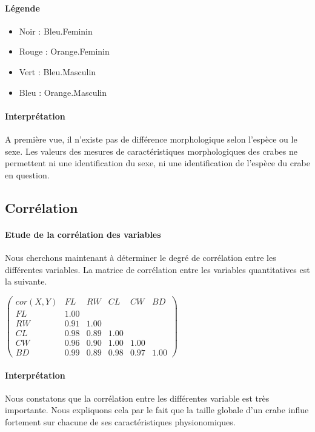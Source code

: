 \documentclass{report}
\begin{document}
\paragraph{Légende}
\begin{itemize}
\item Noir : Bleu.Feminin
\item Rouge : Orange.Feminin
\item Vert : Bleu.Masculin
\item Bleu : Orange.Masculin
\end{itemize}
\paragraph{Interprétation}
A première vue, il n’existe pas de différence morphologique selon l’espèce ou le
sexe. Les valeurs des mesures de caractéristiques morphologiques des crabes ne
permettent ni une identification du sexe, ni une identification de l’espèce du
crabe en question.
\newpage
\subsection{Corrélation}
\paragraph{Etude de la corrélation des variables}
Nous cherchons maintenant à déterminer le degré de corrélation entre les différentes variables. La matrice de corrélation entre les variables quantitatives est la suivante.
\begin{center}
$\begin{pmatrix}
    cor(X,Y) & FL & RW & CL & CW & BD\\
    FL & 1.00\\
    RW & 0.91 & 1.00 \\
    CL & 0.98 & 0.89 & 1.00\\
    CW & 0.96 & 0.90 & 1.00 & 1.00\\
    BD & 0.99 & 0.89 & 0.98 & 0.97 & 1.00
\end{pmatrix}$
\end{center}
\paragraph{Interprétation}
Nous constatons que la corrélation entre les différentes variable est très importante.
Nous expliquons cela par le fait que la taille globale d'un
crabe influe fortement sur chacune de ses caractéristiques physionomiques.
\end{document}
